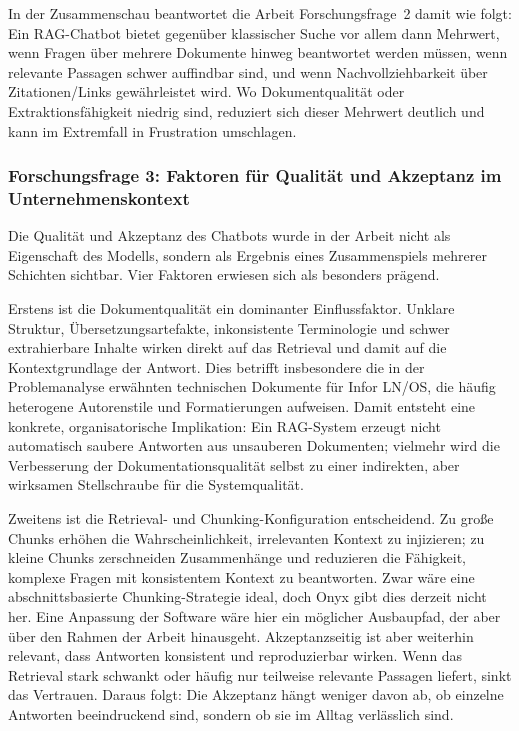 In der Zusammenschau beantwortet die Arbeit Forschungsfrage~2 damit wie folgt:
Ein RAG-Chatbot bietet gegenüber klassischer Suche vor allem dann Mehrwert, wenn Fragen über mehrere Dokumente hinweg beantwortet werden müssen, wenn relevante Passagen schwer auffindbar sind, und wenn Nachvollziehbarkeit über Zitationen/Links gewährleistet wird.
Wo Dokumentqualität oder Extraktionsfähigkeit niedrig sind, reduziert sich dieser Mehrwert deutlich und kann im Extremfall in Frustration umschlagen.

\subsubsection{Forschungsfrage 3: Faktoren für Qualität und Akzeptanz im Unternehmenskontext}

Die Qualität und Akzeptanz des Chatbots wurde in der Arbeit nicht als \glqq Eigenschaft des Modells\grqq{}, sondern als Ergebnis eines Zusammenspiels mehrerer Schichten sichtbar.
Vier Faktoren erwiesen sich als besonders prägend.

Erstens ist die Dokumentqualität ein dominanter Einflussfaktor.
Unklare Struktur, Übersetzungsartefakte, inkonsistente Terminologie und schwer extrahierbare Inhalte wirken direkt auf das Retrieval und damit auf die Kontextgrundlage der Antwort.
Dies betrifft insbesondere die in der Problemanalyse erwähnten technischen Dokumente für Infor LN/OS, die häufig heterogene Autorenstile und Formatierungen aufweisen.
Damit entsteht eine konkrete, organisatorische Implikation: Ein RAG-System erzeugt nicht automatisch \glqq saubere\grqq{} Antworten aus \glqq unsauberen\grqq{} Dokumenten; vielmehr wird die Verbesserung der Dokumentationsqualität selbst zu einer indirekten, aber wirksamen Stellschraube für die Systemqualität.

Zweitens ist die Retrieval- und Chunking-Konfiguration entscheidend.
Zu große Chunks erhöhen die Wahrscheinlichkeit, irrelevanten Kontext zu injizieren; zu kleine Chunks zerschneiden Zusammenhänge und reduzieren die Fähigkeit, komplexe Fragen mit konsistentem Kontext zu beantworten.
Zwar wäre eine abschnittsbasierte Chunking-Strategie ideal, doch Onyx gibt dies derzeit nicht her.
Eine Anpassung der Software wäre hier ein möglicher Ausbaupfad, der aber über den Rahmen der Arbeit hinausgeht.
Akzeptanzseitig ist aber weiterhin relevant, dass Antworten konsistent und reproduzierbar wirken.
Wenn das Retrieval stark schwankt oder häufig nur teilweise relevante Passagen liefert, sinkt das Vertrauen.
Daraus folgt: Die Akzeptanz hängt weniger davon ab, ob einzelne Antworten \glqq beeindruckend\grqq{} sind, sondern ob sie im Alltag verlässlich sind.

